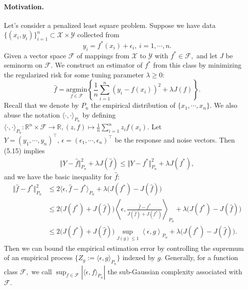 \documentclass{article}
\begin{document}
\paragraph{Motivation.} Let's consider a penalized least square problem. Suppose we have data $\{(x_i,y_i)\}_{i=1}^n\subset\mathcal{X}\times\mathcal{Y}$ collected from
\begin{equation*}
	y_i = f^*(x_i) + \epsilon_i,\ i=1,\cdots,n.\tag{5.23}
\end{equation*}
Given a vector space $\mathcal{F}$ of mappings from $\mathcal{X}$ to $\mathcal{Y}$ with $f^*\in\mathcal{F},$ and let $J$ be seminorm on $\mathcal{F}.$ We construct an estimator of $f^*$ from this class by minimizing the regularized risk for some tuning parameter $\lambda \geq 0$:
\begin{equation*}
	\widehat{f} = \underset{f\in\mathcal{F}}{\mathrm{argmin}}\left\{\frac{1}{n}\sum_{i=1}^n\left(y_i - f(x_i)\right)^2 + \lambda J(f)\right\}.\tag{5.24}
\end{equation*}
Recall that we denote by $P_n$ the empirical distribution of $\{x_1,\cdots,x_n\}.$ We also abuse the notation $\langle\cdot,\cdot\rangle_{P_n}$ by defining $\langle\cdot,\cdot\rangle_{P_n}:\mathbb{R}^n\times\mathcal{F}\to\mathbb{R}, (z,f)\mapsto\frac{1}{n}\sum_{i=1}^n z_if(x_i).$ Let $Y=(y_1,\cdots,y_n)^\top,\,\epsilon=(\epsilon_1,\cdots,\epsilon_n)^\top$ be the response and noise vectors. Then (5.15) implies
\begin{align*}
	\Vert Y-\widehat{f}\Vert_{P_n}^2 + \lambda J(\widehat{f}) \leq \Vert Y-{f}^*\Vert_{P_n}^2 + \lambda J({f}^*),\tag{5.25}
\end{align*}
and we have the basic inequality for $\widehat{f}$:
\begin{align*}
	\Vert\widehat{f}-f^*\Vert_{P_n}^2&\leq 2\langle\epsilon,\widehat{f}-f^*\rangle_{P_n} + \lambda\bigl(J(f^*) - J(\widehat{f})\bigr)\\
	&\leq 2 \bigl(J(f^*) + J(\widehat{f})\bigr)\left\langle\epsilon,\frac{\widehat{f} - f^*}{ J(\widehat{f}) + J(f^*)}\right\rangle_{P_n} + \lambda\bigl(J(f^*) - J(\widehat{f})\bigr)\\
	&\leq 2 \bigl(J(f^*) + J(\widehat{f})\bigr)\sup_{J(g)\leq 1}\left\langle\epsilon,g\right\rangle_{P_n} + \lambda\bigl(J(f^*) - J(\widehat{f})\bigr).\tag{5.26}
\end{align*}
Then we can bound the empirical estimation error by controlling the supremum of an empirical process $\{Z_g:=\langle\epsilon,g\rangle_{P_n}\}$ indexed by $g$. Generally, for a function class $\mathcal{F},$ we call $\sup_{f\in\mathcal{F}}\left\vert\langle\epsilon,f\rangle_{P_n}\right\vert$ the sub-Gaussian complexity associated with $\mathcal{F}.$
\end{document}
